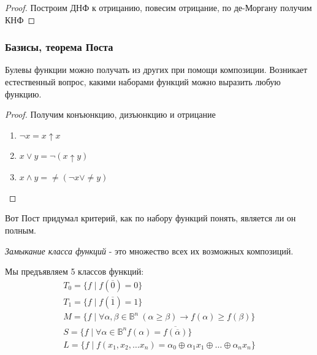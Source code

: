 \documentclass{article}
\begin{document}
\begin{proof}
	Построим ДНФ к отрицанию, повесим отрицание, по де-Моргану получим КНФ 
\end{proof}

\subsubsection{Базисы, теорема Поста}

Булевы функции можно получать из других при помощи композиции. Возникает естественный вопрос, какими наборами функций можно выразить любую функцию.

\begin{proof}
	Получим конъюнкцию, дизъюнкцию и отрицание
	\begin{enumerate}
		\item $\neg x = x \uparrow x$
		\item $x \vee y = \neg (x \uparrow y)$
		\item $x \wedge y = \neq (\neg x \vee \neq y)$
	\end{enumerate}
\end{proof}

Вот Пост придумал критерий, как по набору функций понять, является ли он полным.

\textit{Замыкание класса функций} - это множество всех их возможных композиций.

Мы предъявляем 5 классов функций:
\begin{align*}
	T_0 = \{f \mid f(\overline{0}) = 0\}\\
	T_1 = \{f \mid f(\overline{1}) = 1\}\\
	M = \{f \mid \forall \alpha, \beta \in \mathbb{B}^n\ (\alpha \geq \beta) \rightarrow f(\alpha) \geq f(\beta)\}\\
	S = \{f \mid \forall \alpha \in \mathbb{B}^n f(\alpha) = \overline{f(\overline{\alpha})}\}\\
	L = \{f \mid f(x_1, x_2, \ldots x_n) = \alpha_0 \oplus \alpha_1x_1 \oplus \ldots \oplus \alpha_nx_n\}
\end{align*}

\end{document}
